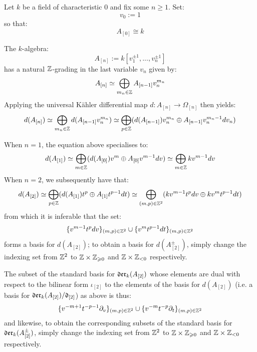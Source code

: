         \begin{remark} \label{remark: basis_for_global_functions_on_split_tori}
            Let $k$ be a field of characteristic $0$ and fix some $n \geq 1$. Set:
                $$v_0 := 1$$
            so that:
                $$A_{[0]} \cong k$$

            The $k$-algebra:
                $$A_{[n]} := k[v_1^{\pm 1}, ..., v_n^{\pm 1}]$$
            has a natural $\mathbb{Z}$-grading in the last variable $v_n$ given by:
                $$A_{[n]} \simeq \bigoplus_{m_n \in \mathbb{Z}} A_{[n - 1]} v_n^{m_n}$$
            Applying the universal K\"ahler differential map $d: A_{[n]} \to \Omega_{[n]}$ then yields:
                $$d( A_{[n]} ) \simeq \bigoplus_{m_n \in \mathbb{Z}} d( A_{[n - 1]} v_n^{m_n} ) \simeq \bigoplus_{p \in \mathbb{Z}} ( d( A_{[n - 1]} ) v_n^{m_n} \oplus A_{[n - 1]} v_n^{m_n - 1} dv_n )$$

            When $n = 1$, the equation above specialises to:
                $$d(A_{[1]}) \simeq \bigoplus_{m \in \mathbb{Z}} ( d( A_{[0]} ) v^m \oplus A_{[0]} v^{m - 1} dv ) \simeq \bigoplus_{m \in \mathbb{Z}} k v^{m - 1} dv$$
            When $n = 2$, we subsequently have that:
                $$d(A_{[2]}) \simeq \bigoplus_{p \in \mathbb{Z}} ( d(A_{[1]}) t^p \oplus A_{[1]} t^{p - 1} dt ) \simeq \bigoplus_{(m, p) \in \mathbb{Z}^2} ( k v^{m - 1} t^p dv \oplus k v^m t^{p - 1} dt )$$
            from which it is inferable that the set:
                $$\{v^{m - 1} t^p dv\}_{(m, p) \in \mathbb{Z}^2} \cup \{v^m t^{p - 1} dt\}_{(m, p) \in \mathbb{Z}^2}$$
            forms a basis for $d(A_{[2]})$; to obtain a basis for $d(A_{[2]}^{\pm})$, simply change the indexing set from $\mathbb{Z}^2$ to $\Z \x \Z_{\geq 0}$ and $\Z \x \Z_{< 0}$ respectively.

            The subset of the standard basis for $\mathfrak{der}_k(A_{[2]})$ whose elements are dual with respect to the bilinear form $\iota_{[2]}$ to the elements of the basis for $d(A_{[2]})$ (i.e. a basis for $\mathfrak{der}_k(A_{[2]})/\mathfrak{d}_{[2]}$) as above is thus:
                $$\{v^{-m + 1} t^{-p - 1} \partial_v\}_{(m, p) \in \mathbb{Z}^2} \cup \{v^{-m} t^{-p} \partial_t\}_{(m, p) \in \mathbb{Z}^2}$$
            and likewise, to obtain the corresponding subsets of the standard basis for $\mathfrak{der}_k(A_{[2]}^{\pm})$, simply change the indexing set from $\mathbb{Z}^2$ to $\Z \x \Z_{\geq 0}$ and $\Z \x \Z_{< 0}$ respectively.


\end{remark}
